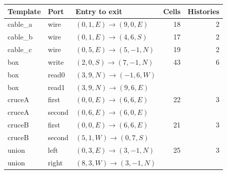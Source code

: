 \begin{longtable}{lllrr}\toprule
Template & Port & Entry to exit & Cells & Histories\\\midrule\endhead
cable\_a & wire & $(0,1,E)\to (9,0,E)$ & 18 & 2\\
cable\_b & wire & $(0,1,E)\to (4,6,S)$ & 17 & 2\\
cable\_c & wire & $(0,5,E)\to (5,-1,N)$ & 19 & 2\\
box & write & $(2,0,S)\to (7,-1,N)$ & 43 & 6\\
box & read0 & $(3,9,N)\to (-1,6,W)$ &  & \\
box & read1 & $(3,9,N)\to (9,6,E)$ &  & \\
cruceA & first & $(0,0,E)\to (6,6,E)$ & 22 & 3\\
cruceA & second & $(0,6,E)\to (6,0,E)$ &  & \\
cruceB & first & $(0,0,E)\to (6,6,E)$ & 21 & 3\\
cruceB & second & $(5,1,W)\to (0,7,S)$ &  & \\
union & left & $(0,3,E)\to (3,-1,N)$ & 25 & 3\\
union & right & $(8,3,W)\to (3,-1,N)$ &  & \\
\bottomrule\end{longtable}
